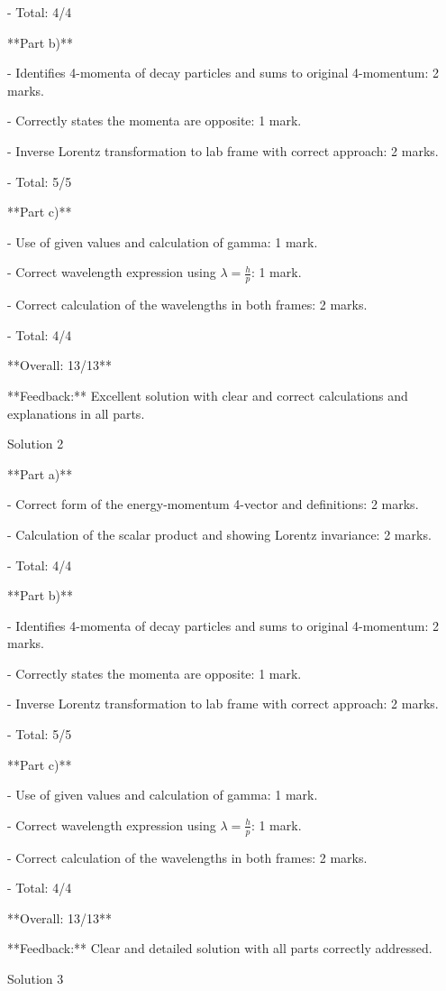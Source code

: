 \documentclass[a4paper,11pt]{article}
\begin{document}
- Total: 4/4

**Part b)**

- Identifies 4-momenta of decay particles and sums to original 4-momentum: 2 marks.

- Correctly states the momenta are opposite: 1 mark.

- Inverse Lorentz transformation to lab frame with correct approach: 2 marks.

- Total: 5/5

**Part c)**

- Use of given values and calculation of gamma: 1 mark.

- Correct wavelength expression using \( \lambda = \frac{h}{p} \): 1 mark.

- Correct calculation of the wavelengths in both frames: 2 marks.

- Total: 4/4

**Overall: 13/13**

**Feedback:** Excellent solution with clear and correct calculations and explanations in all parts.

Solution 2

**Part a)**

- Correct form of the energy-momentum 4-vector and definitions: 2 marks.

- Calculation of the scalar product and showing Lorentz invariance: 2 marks.

- Total: 4/4

**Part b)**

- Identifies 4-momenta of decay particles and sums to original 4-momentum: 2 marks.

- Correctly states the momenta are opposite: 1 mark.

- Inverse Lorentz transformation to lab frame with correct approach: 2 marks.

- Total: 5/5

**Part c)**

- Use of given values and calculation of gamma: 1 mark.

- Correct wavelength expression using \( \lambda = \frac{h}{p} \): 1 mark.

- Correct calculation of the wavelengths in both frames: 2 marks.

- Total: 4/4

**Overall: 13/13**

**Feedback:** Clear and detailed solution with all parts correctly addressed. 

Solution 3
\end{document}
